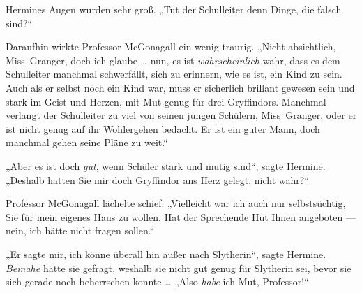 Hermines Augen wurden sehr groß.
„Tut der Schulleiter denn Dinge, die falsch sind?“

Daraufhin wirkte Professor McGonagall ein wenig traurig.
„Nicht absichtlich, Miss~Granger, doch ich glaube … nun, es ist \emph{wahrscheinlich} wahr, dass es dem Schulleiter manchmal schwerfällt, sich zu erinnern, wie es ist, ein Kind zu sein. Auch als er selbst noch ein Kind war, muss er sicherlich brillant gewesen sein und stark im Geist und Herzen, mit Mut genug für drei Gryffindors. Manchmal verlangt der Schulleiter zu viel von seinen jungen Schülern, Miss~Granger, oder er ist nicht genug auf ihr Wohlergehen bedacht. Er ist ein guter Mann, doch manchmal gehen seine Pläne zu weit.“

„Aber es ist doch \emph{gut}, wenn Schüler stark und mutig sind“, sagte Hermine.
„Deshalb hatten Sie mir doch Gryffindor ans Herz gelegt, nicht wahr?“

Professor McGonagall lächelte schief.
„Vielleicht war ich auch nur selbstsüchtig, Sie für mein eigenes Haus zu wollen. Hat der Sprechende Hut Ihnen angeboten — nein, ich hätte nicht fragen sollen.“

„Er sagte mir, ich könne überall hin außer nach Slytherin“, sagte Hermine. \emph{Beinahe} hätte sie gefragt, weshalb sie nicht gut genug für Slytherin sei, bevor sie sich gerade noch beherrschen konnte …
„Also \emph{habe} ich Mut, Professor!“

